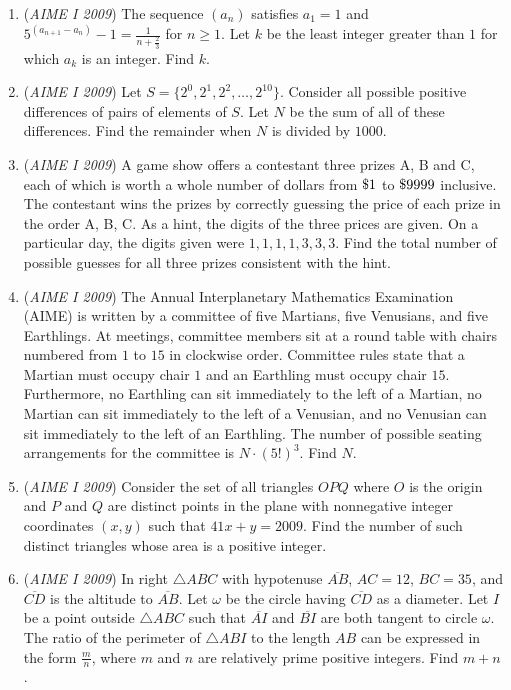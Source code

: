 \begin{enumerate}
 

	\item (\textit{AIME I 2009}) The sequence $(a_n)$ satisfies $a_1 = 1$ and $5^{(a_{n + 1} - a_n)} - 1 = \frac {1}{n + \frac {2}{3}}$ for $n \geq 1$. Let $k$ be the least integer greater than $1$ for which $a_k$ is an integer. Find $k$.


 

	\item (\textit{AIME I 2009}) Let $S = \{2^0,2^1,2^2,\ldots,2^{10}\}$. Consider all possible positive differences of pairs of elements of $S$. Let $N$ be the sum of all of these differences. Find the remainder when $N$ is divided by $1000$.


 

	\item (\textit{AIME I 2009}) A game show offers a contestant three prizes A, B and C, each of which is worth a whole number of dollars from $\text{\textdollar}1$ to $\text{\textdollar}9999$ inclusive. The contestant wins the prizes by correctly guessing the price of each prize in the order A, B, C. As a hint, the digits of the three prices are given. On a particular day, the digits given were $1, 1, 1, 1, 3, 3, 3$. Find the total number of possible guesses for all three prizes consistent with the hint.


 

	\item (\textit{AIME I 2009}) The Annual Interplanetary Mathematics Examination (AIME) is written by a committee of five Martians, five Venusians, and five Earthlings.  At meetings, committee members sit at a round table with chairs numbered from $1$ to $15$ in clockwise order.  Committee rules state that a Martian must occupy chair $1$ and an Earthling must occupy chair $15$.  Furthermore, no Earthling can sit immediately to the left of a Martian, no Martian can sit immediately to the left of a Venusian, and no Venusian can sit immediately to the left of an Earthling.  The number of possible seating arrangements for the committee is $N \cdot (5!)^3$.  Find $N$.


 

	\item (\textit{AIME I 2009}) Consider the set of all triangles $OPQ$ where $O$ is the origin and $P$ and $Q$ are distinct points in the plane with nonnegative integer coordinates $(x,y)$ such that $41x + y = 2009$. Find the number of such distinct triangles whose area is a positive integer.


 

	\item (\textit{AIME I 2009}) In right $\triangle ABC$ with hypotenuse $\overline{AB}$, $AC = 12$, $BC = 35$, and $\overline{CD}$ is the altitude to $\overline{AB}$. Let $\omega$ be the circle having $\overline{CD}$ as a diameter. Let $I$ be a point outside $\triangle ABC$ such that $\overline{AI}$ and $\overline{BI}$ are both tangent to circle $\omega$. The ratio of the perimeter of $\triangle ABI$ to the length $AB$ can be expressed in the form $\frac {m}{n}$, where $m$ and $n$ are relatively prime positive integers. Find $m + n$.



\end{enumerate}
